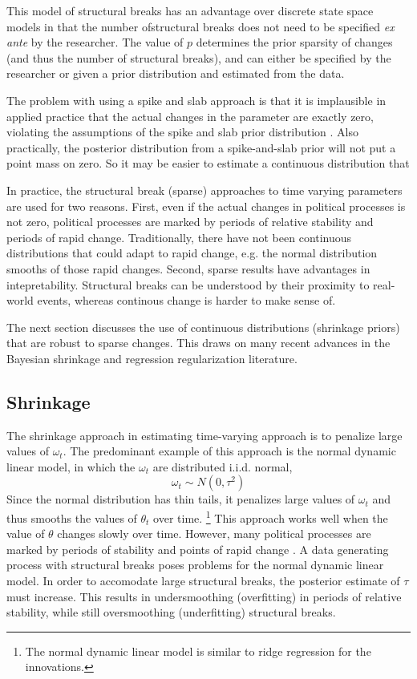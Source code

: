\documentclass{article}
\begin{document}
This model of structural breaks has an advantage over discrete state space models in that the number ofstructural breaks does not need to be specified \textit{ex ante} by the researcher.
The value of $p$ determines the prior sparsity of changes (and thus the number of structural breaks), and can either be specified by the researcher or given a prior distribution and estimated from the data.

The problem with using a spike and slab approach is that it is implausible in applied practice that the actual changes in the parameter are exactly zero, violating the assumptions of the spike and slab prior distribution \parencite{Gelman2013}.
Also practically, the posterior distribution from a spike-and-slab prior will not put a point mass on zero.
So it may be easier to estimate a continuous distribution that 

In practice, the structural break (sparse) approaches to time varying parameters are used for two reasons.
First, even if the actual changes in political processes is not zero, political processes are marked by periods of relative stability and periods of rapid change.
Traditionally, there have not been continuous distributions that could adapt to rapid change, e.g. the normal distribution smooths of those rapid changes.
Second, sparse results have advantages in intepretability.
Structural breaks can be understood by their proximity to real-world events, whereas continous change is harder to make sense of.

The next section discusses the use of continuous distributions (shrinkage priors) that are robust to sparse changes.
This draws on many recent advances in the Bayesian shrinkage and regression regularization literature.

\subsection{Shrinkage}
\label{sec:shrinkage}

The shrinkage approach in estimating time-varying approach is to penalize large values of $\omega_{t}$. 
The predominant example of this approach is the normal dynamic linear model, in which the $\omega_{t}$ are distributed i.i.d. normal,
\begin{equation}
  \label{eq:4}
  \omega_{t} \sim N(0, \tau^{2})
\end{equation}
Since the normal distribution has thin tails, it penalizes large values of $\omega_{t}$ and thus smooths the values of $\theta_{t}$ over time.
\footnote{The normal dynamic linear model is similar to ridge regression for the innovations.}
This approach works well when the value of $\theta$ changes slowly over time.
However, many political processes are marked by periods of stability and points of rapid change \parencite{RatkovicEng2010}.
A data generating process with structural breaks poses problems for the normal dynamic linear model.
In order to accomodate large structural breaks, the posterior estimate of $\tau$ must increase. 
This results in undersmoothing (overfitting) in periods of relative stability, while still oversmoothing (underfitting) structural breaks.
\end{document}
